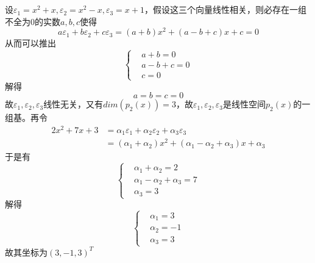 \documentclass{article}
\begin{document}
\section{}
设$\varepsilon_1=x^{2}+x,\varepsilon_2=x^{2}-x,\varepsilon_3=x+1$，假设这三个向量线性相关，则必存在一组不全为0的实数$ a,b,c $使得
\begin{equation}
	a\varepsilon_1+b\varepsilon_2+c\varepsilon_3=(a+b)x^2+(a-b+c)x+c=0
\end{equation}
从而可以推出
\begin{equation}
	\left\{
	\begin{aligned}
		&a+b=0\\
		&a-b+c=0\\
		&c=0
	\end{aligned} 
	\right.
\end{equation}
解得
\begin{equation}
a=b=c=0
\end{equation}
故$\varepsilon_1,\varepsilon_2,\varepsilon_3  $线性无关，又有$ dim(p_2(x))=3 $，故$\varepsilon_1,\varepsilon_2,\varepsilon_3  $是线性空间$ p_2(x) $的一组基。再令
\begin{equation}
	\begin{aligned}
	2x^2+7x+3&=\alpha_1\varepsilon_1 + \alpha_2\varepsilon_2+\alpha_3\varepsilon_3\\
	&=(\alpha_1+\alpha_2)x^2+(\alpha_1-\alpha_2+\alpha_3)x+\alpha_3
	\end{aligned}
\end{equation}
于是有
\begin{equation}
	\left\{
	\begin{aligned}
		&\alpha_1+\alpha_2=2\\
		&\alpha_1-\alpha_2+\alpha_3=7\\
		&\alpha_3=3
	\end{aligned} 
	\right.
\end{equation}
解得
\begin{equation}
	\left\{
	\begin{aligned}
		&\alpha_1=3\\
		&\alpha_2=-1\\
		&\alpha_3=3
	\end{aligned} 
	\right.
\end{equation}
故其坐标为$ (3,-1,3) ^{T}$
\end{document}
